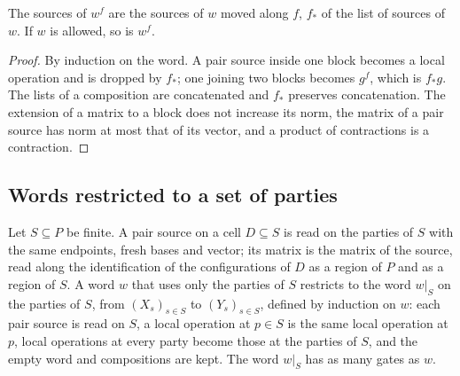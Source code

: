 \begin{theorem}
    \label{thm:party_coarsen_sources}
    \leanok
    The sources of $w^f$ are the sources of $w$ moved along $f$, $f_*$ of the list of
    sources of $w$. If $w$ is allowed, so is $w^f$.
\end{theorem}
\begin{proof}\leanok
    By induction on the word. A pair source inside one block becomes a local operation
    and is dropped by $f_*$; one joining two blocks becomes $g^f$, which is $f_*g$. The
    lists of a composition are concatenated and $f_*$ preserves concatenation. The
    extension of a matrix to a block does not increase its norm, the matrix of a pair
    source has norm at most that of its vector, and a product of contractions is a
    contraction.
\end{proof}

\subsection{Words restricted to a set of parties}
\label{sec:party_restrict}

\begin{definition}
    \label{def:party_restrict}
    \leanok
    Let $S\subseteq P$ be finite. A pair source on a cell $D\subseteq S$ is read on
    the parties of $S$ with the same endpoints, fresh bases and vector; its matrix is
    the matrix of the source, read along the identification of the configurations of
    $D$ as a region of $P$ and as a region of $S$. A word $w$ that uses only the
    parties of $S$ restricts to the word $w|_S$ on the parties of $S$, from
    $(X_s)_{s\in S}$ to $(Y_s)_{s\in S}$, defined by induction on $w$: each pair
    source is read on $S$, a local operation at $p\in S$ is the same local operation
    at $p$, local operations at every party become those at the parties of $S$, and
    the empty word and compositions are kept. The word $w|_S$ has as many gates as
    $w$.
\end{definition}

